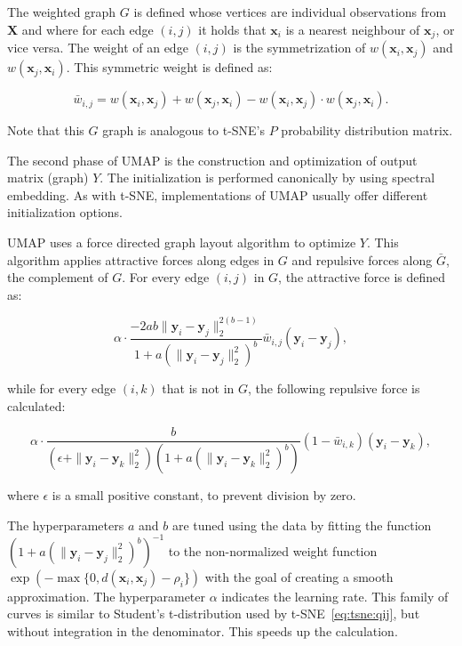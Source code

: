 The weighted graph $G$ is defined whose vertices are individual observations from $\mathbf{X}$ and where for each edge $(i, j)$ it holds that $\mathbf{x}_i$ is a nearest neighbour of $\mathbf{x}_j$, or vice versa. The weight of an edge $(i, j)$ is the symmetrization of $w(\mathbf{x}_i, \mathbf{x}_j)$ and $w(\mathbf{x}_j, \mathbf{x}_i)$. This symmetric weight is defined as:

\begin{equation}
	\bar{w}_{i,j} = w(\mathbf{x}_i,\mathbf{x}_j)+w(\mathbf{x}_j,\mathbf{x}_i)-w(\mathbf{x}_i,\mathbf{x}_j)\cdot w(\mathbf{x}_j,\mathbf{x}_i).
\end{equation}

Note that this $G$ graph is analogous to t-SNE's $P$ probability distribution matrix.

The second phase of UMAP is the construction and optimization of output matrix (graph) $Y$. The initialization is performed canonically by using spectral embedding. As with t-SNE, implementations of UMAP usually offer different initialization options.

UMAP uses a force directed graph layout algorithm to optimize $Y$. This algorithm applies attractive forces along edges in $G$ and repulsive forces along $\bar{G}$, the complement of $G$. For every edge $(i, j)$ in $G$, the attractive force is defined as:

\begin{equation}
	\alpha\cdot
	\frac{-2ab\|\mathbf{y}_i-\mathbf{y}_j\|_2^{2(b-1)}}{1+a\left(\|\mathbf{y}_i-\mathbf{y}_j\|_2^{2}\right)^b}
	\bar{w}_{i,j}(\mathbf{y}_i-\mathbf{y}_j),
\end{equation}

while for every edge $(i, k)$  that is not in $G$, the following repulsive force is calculated:

\begin{equation}
	\alpha\cdot
	\frac{b}{\left(\epsilon+\|\mathbf{y}_i-\mathbf{y}_k\|_2^2\right)\left(1+a\left(\|\mathbf{y}_i-\mathbf{y}_k\|_2^{2}\right)^b\right)}
	\left(1- \bar{w}_{i,k}\right)(\mathbf{y}_i-\mathbf{y}_k),
\end{equation}

where $\epsilon$ is a small positive constant, to prevent division by zero.

The hyperparameters $a$ and $b$ are tuned using the data by fitting the function $\left(1+a\left(\|\mathbf{y}_i-\mathbf{y}_j\|_2^{2}\right)^b\right)^{-1}$ to the non-normalized weight function $\exp\left({-\max\{0,d(\mathbf{x}_i, \mathbf{x}_j)-\rho_i\}}\right)$ with the goal of creating a smooth approximation. The hyperparameter $\alpha$ indicates the learning rate. This family of curves is similar to Student's t-distribution used by t-SNE~\eqref{eq:tsne:qij}, but without integration in the denominator. This speeds up the calculation.

